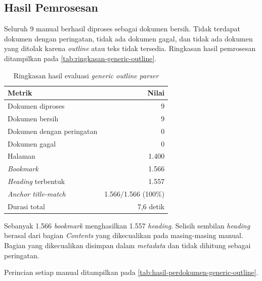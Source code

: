 \subsection{Hasil Pemrosesan}
\label{sec:hasil-pemrosesan-generic-outline}

Seluruh 9 manual berhasil diproses sebagai dokumen bersih.
Tidak terdapat dokumen dengan peringatan, tidak ada dokumen gagal, dan tidak ada dokumen yang ditolak karena \textit{outline} atau teks tidak tersedia.
Ringkasan hasil pemrosesan ditampilkan pada \autoref{tab:ringkasan-generic-outline}.

\begin{table}[H]
  \centering
  \footnotesize
  \caption{Ringkasan hasil evaluasi \textit{generic outline parser}}
  \label{tab:ringkasan-generic-outline}
  \begin{tabular}{@{}lr@{}}
    \toprule
    \textbf{Metrik} & \textbf{Nilai} \\
    \midrule
    Dokumen diproses & 9 \\
    Dokumen bersih & 9 \\
    Dokumen dengan peringatan & 0 \\
    Dokumen gagal & 0 \\
    Halaman & 1.400 \\
    \textit{Bookmark} & 1.566 \\
    \textit{Heading} terbentuk & 1.557 \\
    \textit{Anchor title-match} & 1.566/1.566 (100\%) \\
    Durasi total & 7,6 detik \\
    \bottomrule
  \end{tabular}
\end{table}

Sebanyak 1.566 \textit{bookmark} menghasilkan 1.557 \textit{heading}.
Selisih sembilan \textit{heading} berasal dari bagian \textit{Contents} yang dikecualikan pada masing-masing manual.
Bagian yang dikecualikan disimpan dalam \textit{metadata}  dan tidak dihitung sebagai peringatan.

Perincian setiap manual ditampilkan pada \autoref{tab:hasil-perdokumen-generic-outline}.

